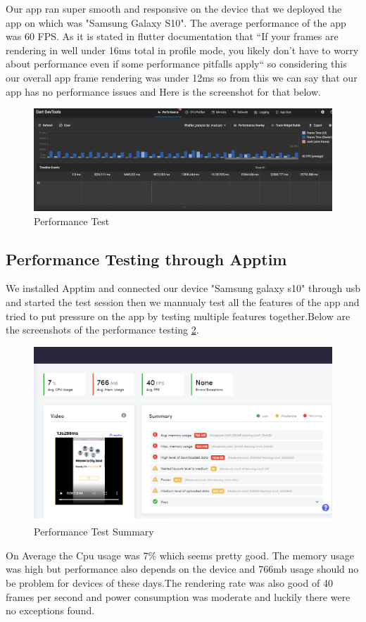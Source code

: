 Our app ran super smooth and responsive on the device that we deployed the app on which was "Samsung Galaxy S10". The average performance of the app was 60 FPS. As it is stated in flutter documentation \cite{PerformanceDocs:online} that ``If your frames are rendering in well under 16ms total in profile mode, you likely don’t have to worry about performance even if some performance pitfalls apply`` so considering this our overall app frame rendering was under 12ms so from this we can say that our app has no performance issues and Here is the screenshot for that below.

\begin{figure}[!htb]
    \centering
    \includegraphics[scale=0.35]{img/performance test.PNG}
    \caption{Performance Test}
    \label{fig:Performance Test}
\end{figure}

\subsection{Performance Testing through Apptim}
We installed Apptim and connected our device "Samsung galaxy s10" through usb and started the test session then we mannualy test all the features of the app and tried to put pressure on the app by testing multiple features together.Below are the screenshots of the performance testing \ref{fig:Performance Test Summary}.

\begin{figure}[!htb]
    \centering
    \includegraphics[scale=0.45]{testingshots/Performance1.PNG}
    \caption{Performance Test Summary}
    \label{fig:Performance Test Summary}
\end{figure}
On Average the Cpu usage was 7\% which seems pretty good. The memory usage was high but performance also depends on the device and 766mb usage should no be problem for devices of these days.The rendering rate was also good of 40 frames per second and power consumption was moderate and luckily there were no exceptions found.

